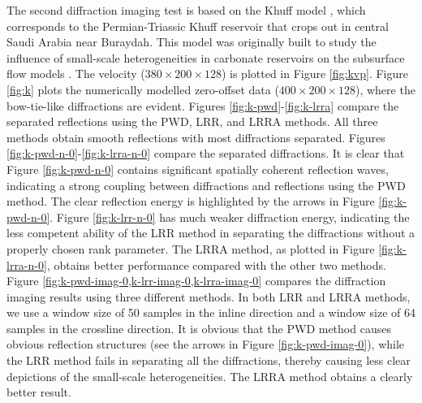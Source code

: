 \documentclass[10pt]{IEEEtran}
\begin{document}
%
%


The second diffraction imaging test is based on the Khuff model \cite{decker2015carbonate,janson2013outcrop}, which corresponds to the Permian-Triassic Khuff reservoir that crops out in central Saudi Arabia near Buraydah. This model was originally built to study the influence of small-scale heterogeneities in carbonate reservoirs on the subsurface flow models \cite{janson2013outcrop}. The velocity ($380\times200\times 128$) is plotted in Figure \ref{fig:kvp}. Figure \ref{fig:k} plots the numerically modelled zero-offset data ($400\times200\times 128$), where the bow-tie-like diffractions are evident. Figures \ref{fig:k-pwd}-\ref{fig:k-lrra} compare the separated reflections using the PWD, LRR, and LRRA methods.  All three methods obtain smooth reflections with most diffractions separated. Figures \ref{fig:k-pwd-n-0}-\ref{fig:k-lrra-n-0} compare the separated diffractions. It is clear that Figure \ref{fig:k-pwd-n-0} contains significant spatially coherent reflection waves, indicating a strong coupling between diffractions and reflections using the PWD method. The clear reflection energy is highlighted by the arrows in Figure \ref{fig:k-pwd-n-0}. Figure \ref{fig:k-lrr-n-0} has much weaker diffraction energy, indicating the less competent ability of the LRR method in separating the diffractions without a properly chosen rank parameter. The LRRA method, as plotted in Figure \ref{fig:k-lrra-n-0}, obtains better performance compared with the other two methods. Figure \ref{fig:k-pwd-imag-0,k-lrr-imag-0,k-lrra-imag-0} compares  the diffraction imaging results using three different methods. In both LRR and LRRA methods, we use a window size of 50 samples in the inline direction and a window size of 64 samples in the crossline direction. It is obvious that the PWD method causes obvious reflection structures (see the arrows in Figure \ref{fig:k-pwd-imag-0}), while the LRR method fails in separating all the diffractions, thereby causing less clear depictions of the small-scale heterogeneities. The LRRA method obtains a clearly better result.  
\end{document}
